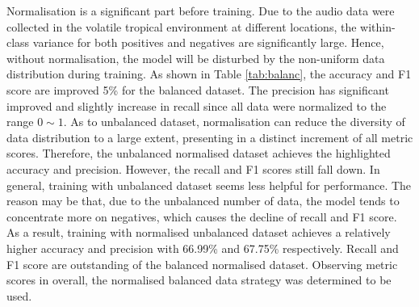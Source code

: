 Normalisation is a significant part before training. Due to the audio data were collected in the volatile tropical environment at different locations, the within-class variance for both positives and negatives are significantly large. Hence, without normalisation, the model will be disturbed by the non-uniform data distribution during training. As shown in Table \ref{tab:balanc}, the accuracy and F1 score are improved 5\% for the balanced dataset. The precision has significant improved and slightly increase in recall since all data were normalized to the range $0\sim1$. As to unbalanced dataset, normalisation can reduce the diversity of data distribution to a large extent, presenting in a distinct increment of all metric scores. Therefore, the unbalanced normalised dataset achieves the highlighted accuracy and precision. However, the recall and F1 scores still fall down. In general, training with unbalanced dataset seems less helpful for performance. The reason may be that, due to the unbalanced number of data, the model tends to concentrate more on negatives, which causes the decline of recall and F1 score. As a result, training with normalised unbalanced dataset achieves a relatively higher accuracy and precision with 66.99\% and 67.75\% respectively. Recall and F1 score are outstanding of the balanced normalised dataset. Observing metric scores in overall, the normalised balanced data strategy was determined to be used.

